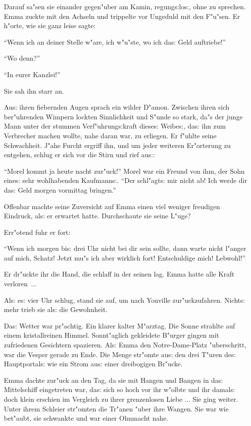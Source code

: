 \documentclass[oneside,12pt]{book}
\newcommand{\s}{s:}%
\begin{document}
Darauf sa"sen sie einander gegen"uber am Kamin, regung{\s}lo{\s},
ohne zu sprechen. Emma zuckte mit den Achseln und trippelte vor
Ungeduld mit den F"u"sen. Er h"orte, wie sie ganz leise sagte:

"`Wenn ich an deiner Stelle w"are, ich w"u"ste, wo ich da{\s} Geld
auftriebe!"'

"`Wo denn?"'

"`In eurer Kanzlei!"'

Sie sah ihn starr an.

Au{\s} ihren fiebernden Augen sprach ein wilder D"amon. Zwischen
ihren sich ber"uhrenden Wimpern lockten Sinnlichkeit und S"unde so
stark, da"s der junge Mann unter der stummen Verf"uhrung{\s}kraft
diese{\s} Weibe{\s}, da{\s} ihn zum Verbrecher machen wollte, nahe
daran war, zu erliegen. Er f"uhlte seine Schwachheit. J"ahe Furcht
ergriff ihn, und um jeder weiteren Er"orterung zu entgehen, schlug
er sich vor die Stirn und rief au{\s}:

"`Morel kommt ja heute nacht zur"uck!"' Morel war ein Freund von
ihm, der Sohn eine{\s} sehr wohlhabenden Kaufmann{\s}. "`Der
schl"agt{\s} mir nicht ab! Ich werde dir da{\s} Geld morgen
vormittag bringen."'

Offenbar machte seine Zuversicht auf Emma einen viel weniger
freudigen Eindruck, al{\s} er erwartet hatte. Durchschaute sie
seine L"uge?

Err"otend fuhr er fort:

"`Wenn ich morgen bi{\s} drei Uhr nicht bei dir sein sollte, dann
warte nicht l"anger auf mich, Schatz! Jetzt mu"s ich aber wirklich
fort! Entschuldige mich! Lebwohl!"'

Er dr"uckte ihr die Hand, die schlaff in der seinen lag. Emma
hatte alle Kraft verloren~...

Al{\s} e{\s} vier Uhr schlug, stand sie auf, um nach Yonville
zur"uckzufahren. Nicht{\s} mehr trieb sie al{\s} die Gewohnheit.

Da{\s} Wetter war pr"achtig. Ein klarer kalter M"arztag. Die Sonne
strahlte auf einem kristallreinen Himmel. Sonnt"aglich gekleidete
B"urger gingen mit zufriedenen Gesichtern spazieren. Al{\s} Emma
den Notre-Dame-Platz "uberschritt, war die Vesper gerade zu Ende.
Die Menge str"omte au{\s} den drei T"uren de{\s} Hauptportal{\s}
wie ein Strom au{\s} einer dreibogigen Br"ucke.

Emma dachte zur"uck an den Tag, da sie mit Hangen und Bangen in
da{\s} Mittelschiff eingetreten war, da{\s} sich so hoch vor ihr
w"olbte und ihr damal{\s} doch klein erschien im Vergleich zu
ihrer grenzenlosen Liebe ... Sie ging weiter. Unter ihrem Schleier
str"omten die Tr"anen "uber ihre Wangen. Sie war wie bet"aubt, sie
schwankte und war einer Ohnmacht nahe.
\end{document}
